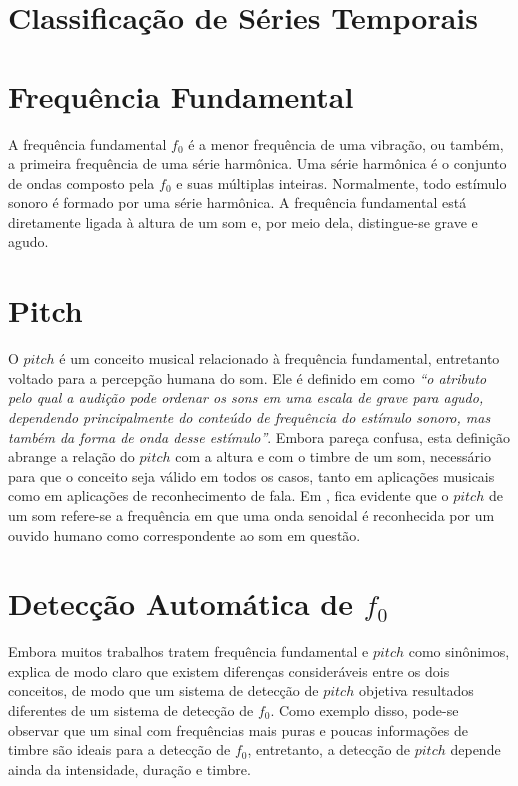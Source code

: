 \section{Classificação de Séries Temporais}


\section{Frequência Fundamental}

A frequência fundamental $f_0$ é a menor frequência de uma vibração, ou também, a primeira frequência de uma série harmônica. Uma série harmônica é o conjunto de ondas composto pela $f_0$ e suas múltiplas inteiras. Normalmente, todo estímulo sonoro é formado por uma série harmônica. A frequência fundamental está diretamente ligada à altura de um som e, por meio dela, distingue-se grave e agudo.


\section{Pitch}


O $pitch$ é um conceito musical relacionado à frequência fundamental, entretanto voltado para a percepção humana do som. Ele é definido em \cite{hartmann1996} como \textit{``o atributo pelo qual a audição pode ordenar os sons em uma escala de grave para agudo, dependendo principalmente do conteúdo de frequência do estímulo sonoro, mas também da forma de onda desse estímulo''}. Embora pareça confusa, esta definição abrange a relação do $pitch$ com a altura e com o timbre de um som, necessário para que o conceito seja válido em todos os casos, tanto em aplicações musicais como em aplicações de reconhecimento de fala. Em \cite{klapuri2006}, fica evidente que o $pitch$ de um som refere-se a frequência em que uma onda senoidal é reconhecida por um ouvido humano como correspondente ao som em questão.


\section{Detecção Automática de $f_0$}

Embora muitos trabalhos tratem frequência fundamental e $pitch$ como sinônimos, \cite{gerhard2003} explica de modo claro que existem diferenças consideráveis entre os dois conceitos, de modo que um sistema de detecção de $pitch$ objetiva resultados diferentes de um sistema de detecção de $f_0$. Como exemplo disso, pode-se observar que um sinal com frequências mais puras e poucas informações de timbre são ideais para a detecção de $f_0$, entretanto, a detecção de $pitch$ depende ainda da intensidade, duração e timbre.


